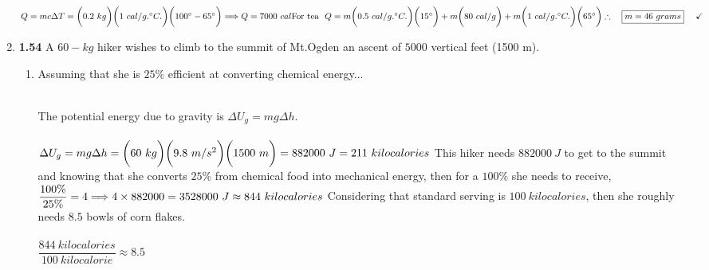 \documentclass[fleqn]{article}
\begin{document}
\begin{enumerate}
        \textcolor{hwColor}{
          \\
          $
            Q=mc \Delta T=\bigg( 0.2 ~ kg \bigg) \bigg( 1 ~ cal/g.^{\circ}C. \bigg) \bigg( 100^{\circ}-65^{\circ} \bigg)
            \Longrightarrow Q=7000 ~ cal
            \\
            \\
            \\
            \text{For tea} ~~ Q=m \bigg( 0.5 ~ cal/g.^{\circ}C. \bigg) \bigg( 15^{\circ} \bigg)
            +m \bigg( 80 ~ cal/g \bigg)
            +m\bigg( 1 ~ cal/g.^{\circ}C. \bigg) \bigg( 65^{\circ} \bigg)
            \\
            \\
            \\
            \therefore ~~~ \boxed{
              m=46 ~ grams
            } ~~~~ \checkmark
            \\
            \\
          $
        }

    \item \textbf{1.54} A $60-kg$ hiker wishes to climb to the summit of Mt.Ogden an ascent of $5000$ vertical
    feet (1500 m).
    \begin{enumerate}
      \item Assuming that she is $25\%$ efficient at converting chemical energy...

        \textcolor{hwColor}{
          \\
          The potential energy due to gravity is $\Delta U_g=mg \Delta h$.
          \\
          \\
          $
            \Delta U_g=mg \Delta h=\bigg( 60 ~ kg \bigg)  \bigg( 9.8 ~ m/s^2\bigg) \bigg( 1500 ~ m \bigg)=882000 ~ J=211 ~ kilocalories
            \\
            \\
            \\ 
          $
          This hiker needs $882000 ~ J$ to get to the summit and knowing that she converts $25\%$ from chemical food 
          into mechanical energy, then for a $100\%$ she needs to receive, 
          $
            \dfrac{100\%}{25\%}=4
            \\
            \\
            \Longrightarrow 4 \times 882000=3528000 ~ J \approx 844 ~ kilocalories
            \\
            \\
          $
          Considering that standard serving is $100 ~ kilocalories$, then she roughly needs $8.5$ bowls of corn flakes.
          \\
          \\
          $
            \dfrac{844 ~ kilocalories}{100 ~ kilocalorie} \approx 8.5
          $
          \\
          \\
        }


\end{enumerate}
\end{enumerate}
\end{document}
